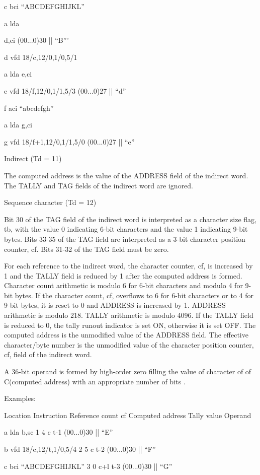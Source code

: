 c bci {``}ABCDEFGHIJKL''

a lda

d,ci (00...0)30 || {``}B'''

d vfd 18/c,12/0,1/0,5/1

a lda e,ci

e vfd 18/f,12/0,1/1,5/3 (00...0)27 || {``}d''

f aci {``}abcdefgh''

a lda g,ci

g vfd 18/f+1,12/0,1/1,5/0 (00...0)27 || {``}e''

Indirect (Td = 11)

The computed address is the value of the ADDRESS field of the indirect word. The TALLY and TAG fields of the indirect word are ignored.


Sequence character (Td = 12)

Bit 30 of the TAG field of the indirect word is interpreted as a character size
flag, tb, with the value 0 indicating 6-bit characters and the value 1
indicating 9-bit bytes. Bits 33-35 of the TAG field are interpreted as a 3-bit
character position counter, cf. Bits 31-32 of the TAG field must be zero.


For each reference to the indirect word, the character counter, cf, is
increased by 1 and the TALLY field is reduced by 1 after the computed address
is formed. Character count arithmetic is modulo 6 for 6-bit characters and
modulo 4 for 9-bit bytes. If the character count, cf, overflows to 6 for 6-bit
characters or to 4 for 9-bit bytes, it is reset to 0 and ADDRESS is increased
by 1. ADDRESS arithmetic is modulo 218. TALLY arithmetic is modulo 4096. If the
TALLY field is reduced to 0, the tally runout indicator is set ON, otherwise it
is set OFF. The computed address is the unmodified value of the ADDRESS field.
The effective character/byte number is the unmodified value of the character
position counter, cf, field of the indirect word.


A 36-bit operand is formed by high-order zero filling the value of character of
of C(computed address) with an appropriate number of bits .


Examples:

Location Instruction Reference count cf Computed address Tally value Operand

a lda b,sc 1 4 c t-1 (00...0)30 || {``}E''

b vfd 18/c,12/t,1/0,5/4 2 5 c t-2 (00...0)30 || {``}F''

c bci {``}ABCDEFGHIJKL'' 3 0 c+l t-3 (00...0)30 || {``}G''

